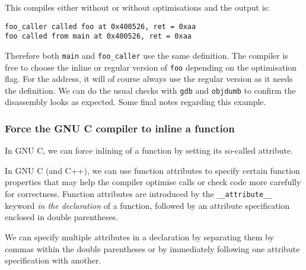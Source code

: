 \documentclass[a4paper]{article}
\begin{document}
This compiles either without or without optimisations and the output is:
\begin{verbatim}
foo_caller called foo at 0x400526, ret = 0xaa
foo called from main at 0x400526, ret = 0xaa
\end{verbatim}
Therefore both \texttt{main} and \texttt{foo\_caller} use the same definition. The compiler is free to choose the inline or regular version of \texttt{foo} depending on the optimisation flag. For the address, it will of course always use the regular version as it needs the definition. We can do the usual checks with \texttt{gdb} and \texttt{objdumb} to confirm the disassembly looks as expected. Some final notes regarding this example.




\subsubsection{Force the GNU C compiler to inline a function}

In GNU C, we can force inlining of a function by setting its so-called attribute.

In GNU C (and C++), we can use function attributes to specify certain function properties that may help the compiler optimise calls or check code more carefully for correctness. Function attributes are introduced by the \texttt{\_\_attribute\_\_} keyword \textit{in the declaration} of a function, followed by an attribute specification enclosed in double parentheses.

We can specify multiple attributes in a declaration by separating them by commas within the double parentheses or by immediately following one attribute specification with another.
\end{document}
